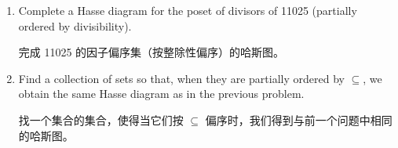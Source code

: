 \begin{enumerate}
    \wbvfill
    
    \workbookpagebreak
    
    \item Complete a Hasse diagram for the poset of divisors of 11025 (partially ordered by divisibility).
    
    \noindent 完成 11025 的因子偏序集（按整除性偏序）的哈斯图。
    
    \wbvfill
    
    
    \item Find a collection of sets so that, when they are partially ordered by $\subseteq$, we obtain the same Hasse diagram as in the previous problem.
    
    \noindent 找一个集合的集合，使得当它们按 $\subseteq$ 偏序时，我们得到与前一个问题中相同的哈斯图。
    
    \wbvfill
    
    \workbookpagebreak
    
    
    \end{enumerate}
    
